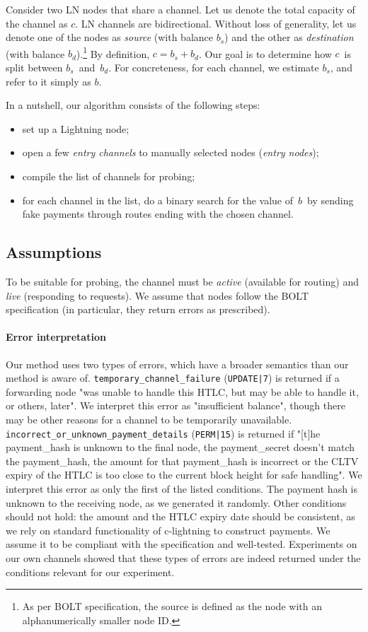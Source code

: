 Consider two LN nodes that share a channel.
Let us denote the total capacity of the channel as $c$.
LN channels are bidirectional.
Without loss of generality, let us denote one of the nodes as \textit{source} (with balance $b_s$) and the other as \textit{destination} (with balance $b_d$).\footnote{As per BOLT specification, the source is defined as the node with an alphanumerically smaller node ID.}
By definition, $c = b_s + b_d$.
Our goal is to determine how $c$~is split between $b_s$~and~$b_d$.
For concreteness, for each channel, we estimate $b_s$, and refer to it simply as $b$.

In a nutshell, our algorithm consists of the following steps:
\begin{itemize}
	\item set up a Lightning node;
	\item open a few \textit{entry channels} to manually selected nodes (\textit{entry nodes});
	\item compile the list of channels for probing;
	\item for each channel in the list, do a binary search for the value of~$b$~by sending fake payments through routes ending with the chosen channel.
\end{itemize}

\subsection{Assumptions}

To be suitable for probing, the channel must be \textit{active} (available for routing) and \textit{live} (responding to requests).
We assume that nodes follow the BOLT specification (in particular, they return errors as prescribed).

\paragraph{Error interpretation}
Our method uses two types of errors, which have a broader semantics than our method is aware of.
\texttt{temporary\_channel\_failure} (\texttt{UPDATE|7}) is returned if a forwarding node "was unable to handle this HTLC, but may be able to handle it, or others, later".
We interpret this error as "insufficient balance", though there may be other reasons for a channel to be temporarily unavailable.
\texttt{incorrect\_or\_unknown\_payment\_details} (\texttt{PERM|15}) is returned if "[t]he payment\_hash is unknown to the final node, the payment\_secret doesn't match the payment\_hash, the amount for that payment\_hash is incorrect or the CLTV expiry of the HTLC is too close to the current block height for safe handling".
We interpret this error as only the first of the listed conditions.
The payment hash is unknown to the receiving node, as we generated it randomly.
Other conditions should not hold: the amount and the HTLC expiry date should be consistent, as we rely on standard functionality of c-lightning to construct payments.
We assume it to be compliant with the specification and well-tested.
Experiments on our own channels showed that these types of errors are indeed returned under the conditions relevant for our experiment.

